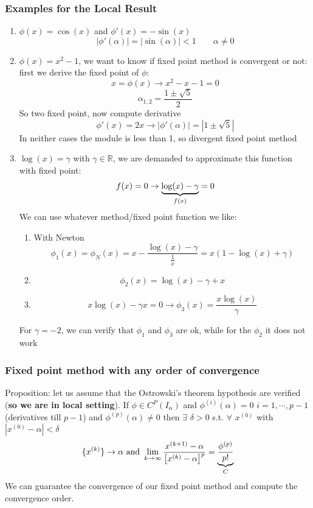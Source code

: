 \subsubsection{Examples for the Local Result}
\begin{enumerate}
    \item $\phi(x)=\cos(x)$ and $\phi'(x)=-\sin(x)$
    $$|\phi'(\alpha)|=|\sin(\alpha)|<1\qquad \alpha\neq 0$$
    \item $\phi(x)=x^2-1$, we want to know if fixed point method is convergent or not: first we derive the fixed point of $\phi$:
    $$x=\phi(x)\rightarrow x^2-x-1=0$$
    $$\alpha_{1,2}=\frac{1\pm\sqrt{5}}{2}$$
    So two fixed point, now compute derivative
    $$\phi'(x)=2x\rightarrow|\phi'(\alpha)|=\left|1\pm\sqrt{5}\right|$$
    In neither cases the module is less than 1, so divergent fixed point method
    \item $\log(x)=\gamma$ with $\gamma\in\mathbb{R}$, we are demanded to approximate this function with fixed point:
    $$f(x)=0\rightarrow \underlabel{\log(x)-\gamma}{$f(x)$}=0$$
    We can use whatever method/fixed point function we like:
    \begin{enumerate}
        \item With Newton
        $$\phi_1(x)=\phi_N(x)=x-\frac{\log(x)-\gamma}{\frac{1}{x}}=x(1-\log(x)+\gamma)$$
        \item 
        $$\phi_2(x)=\log(x)-\gamma+x$$
        \item 
        $$x\log(x)-\gamma x=0\rightarrow\phi_3(x)=\frac{x\log(x)}{\gamma}$$
    \end{enumerate}
    For $\gamma=-2$, we can verify that $\phi_1$ and $\phi_3$ are ok, while for the $\phi_2$ it does not work
\end{enumerate}

\subsubsection{Fixed point method with any order of convergence}
Proposition: let us assume that the Ostrowski's theorem hypothesis are verified (\textbf{so we are in local setting}). If $\phi\in C^P(I_\alpha)$ and $\phi^{(i)}(\alpha)=0\,\,i=1,\cdots,p-1$ (derivatives till $p-1$) and $\phi^{(p)}(\alpha)\neq 0$ then $\exists\,\,\delta>0$ s.t. $\forall\,\,x^{(0)}$ with $\left|x^{(0)}-\alpha\right|<\delta$
$$
\brackets{x^{(k)}}\rightarrow\alpha\text{ and }\lim_{k\rightarrow\infty}\frac{x^{(k+1)}-\alpha}{\left[x^{(k)}-\alpha\right]^p}=\underlabel{\frac{\phi^{(p)}}{p!}}{$C$}
$$
We can guarantee the convergence of our fixed point method and compute the convergence order.

